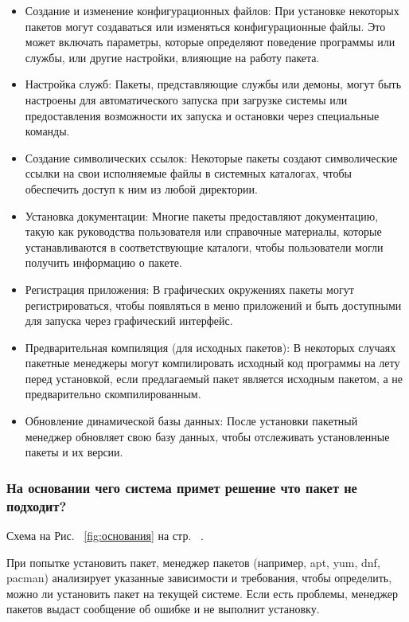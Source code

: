 \documentclass[oneside, final, 14pt]{extreport} %
\begin{document}
\begin{itemize}
    \item Создание и изменение конфигурационных файлов: При установке некоторых пакетов могут создаваться или изменяться конфигурационные файлы. Это может включать параметры, которые определяют поведение программы или службы, или другие настройки, влияющие на работу пакета.
    \item Настройка служб: Пакеты, представляющие службы или демоны, могут быть настроены для автоматического запуска при загрузке системы или предоставления возможности их запуска и остановки через специальные команды.
    \item Создание символических ссылок: Некоторые пакеты создают символические ссылки на свои исполняемые файлы в системных каталогах, чтобы обеспечить доступ к ним из любой директории.
    \item Установка документации: Многие пакеты предоставляют документацию, такую как руководства пользователя или справочные материалы, которые устанавливаются в соответствующие каталоги, чтобы пользователи могли получить информацию о пакете.
    \item Регистрация приложения: В графических окружениях пакеты могут регистрироваться, чтобы появляться в меню приложений и быть доступными для запуска через графический интерфейс.
    \item Предварительная компиляция (для исходных пакетов): В некоторых случаях пакетные менеджеры могут компилировать исходный код программы на лету перед установкой, если предлагаемый пакет является исходным пакетом, а не предварительно скомпилированным.
    \item Обновление динамической базы данных: После установки пакетный менеджер обновляет свою базу данных, чтобы отслеживать установленные пакеты и их версии.
\end{itemize}

\subsubsection{На основании чего система примет решение что пакет не подходит?}

Схема на Рис.~ \ref{fig:основания} на стр.~ \pageref{fig:основания}.

При попытке установить пакет, менеджер пакетов (например, apt, yum, dnf, pacman) анализирует указанные зависимости и требования, чтобы определить, можно ли установить пакет на текущей системе. Если есть проблемы, менеджер пакетов выдаст сообщение об ошибке и не выполнит установку.
\end{document}
